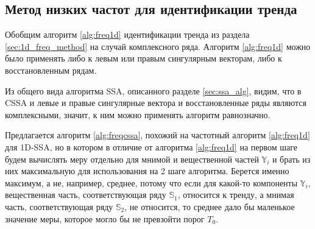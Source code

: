 \documentclass[specialist,
               substylefile = spbu.rtx,
               subf,href,colorlinks=true, 12pt]{disser}
\begin{document}
%

\subsection{Метод низких частот для идентификации тренда}
\label{sec:freq_method_cssa}
Обобщим алгоритм \ref{alg:freq1d} идентификации тренда из раздела \ref{sec:1d_freq_method} на случай комплексного ряда. Алгоритм \ref{alg:freq1d} можно было применять либо к левым или правым сингулярным векторам, либо к восстановленным рядам.


Из общего вида алгоритма SSA, описанного  разделе \ref{sec:ssa_alg}, видим, что в CSSA и левые и правые сингулярные вектора и восстановленные ряды являются комплексными, значит, к ним можно применять алгоритм равнозначно.

Предлагается алгоритм \ref{alg:freqcssa}, похожий на частотный алгоритм \ref{alg:freq1d} для 1D-SSA, но в котором в отличие от алгоритма \ref{alg:freq1d} на первом шаге будем вычислять меру отдельно для мнимой и вещественной частей $\mathbb{Y}_i$ и брать из них максимальную для использования на 2 шаге алгоритма. 
Берется именно максимум, а не, например, среднее, потому что если для какой-то компоненты $\mathbb{Y}_i$, вещественная часть, соответствующая ряду $\mathbb{S}_1$, относится к тренду, а мнимая часть, соответствующая ряду $\mathbb{S}_2$, не относится, то среднее дало бы маленькое значение меры, которое могло бы не превзойти порог $T_0$.
\end{document}
